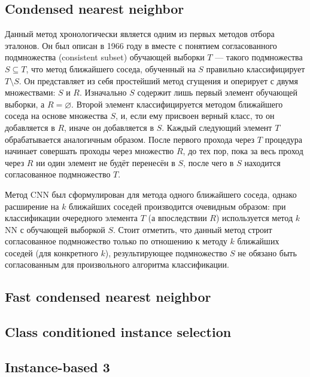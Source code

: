 \subsection{Condensed nearest neighbor}
Данный метод хронологически является одним из первых методов отбора эталонов. Он был описан в 1966 году в \cite{hart} вместе с понятием согласованного подмножества (consistent subset) обучающей выборки \(T\) --- такого подмножества \(S\subseteq T\), что метод ближайшего соседа, обученный на \(S\) правильно классифицирует \(T\setminus S\). Он представляет из себя простейший метод сгущения и оперирует с двумя множествами: \(S\) и \(R\). Изначально \(S\) содержит лишь первый элемент обучающей выборки, а \(R=\varnothing\). Второй элемент классифицируется методом ближайшего соседа на основе множества \(S\), и, если ему присвоен верный класс, то он добавляется в \(R\), иначе он добавляется в \(S\). Каждый следующий элемент \(T\) обрабатывается аналогичным образом. После первого прохода через \(T\) процедура начинает совершать проходы через множество \(R\), до тех пор, пока за весь проход через \(R\) ни один элемент не будёт перенесён в \(S\), после чего в \(S\) находится согласованное подмножество \(T\).

Метод CNN был сформулирован для метода одного ближайшего соседа, однако расширение на \(k\) ближайших соседей производится очевидным образом: при классификации очередного элемента \(T\) (а впоследствии \(R\)) используется метод \(k\)NN с обучающей выборкой \(S\). Стоит отметить, что данный метод строит согласованное подмножество только по отношению к методу \(k\) ближайших соседей (для конкретного \(k\)), результирующее подмножество \(S\) не обязано быть согласованным для произвольного алгоритма классификации.

\subsection{Fast condensed nearest neighbor}
\subsection{Class conditioned instance selection}
\subsection{Instance-based 3}
